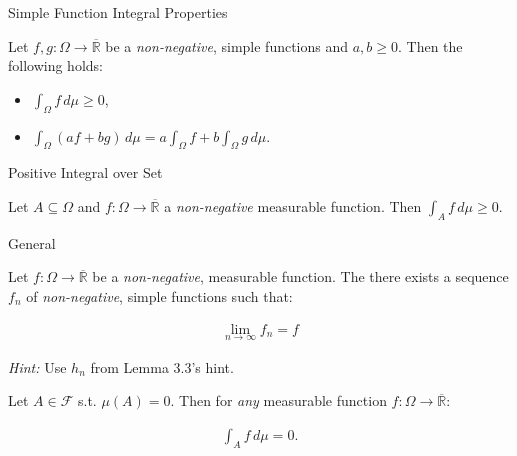 \documentclass[10pt,landscape]{article}
\renewcommand{\geq}{\geqslant}
\newcommand{\Hint}{\textit{Hint: }}
\newcommand{\CalF}{\mathcal{F}}
\begin{document}
\begin{multicols}{3}
\begin{lemma}{3.3}{}
\end{lemma}

\begin{lemma}{}{Simple Function Integral Properties}

    Let $f,g: \Omega \to \overline{\mathbb{R}}$ be a \emph{non-negative}, simple functions and $a,b \geq 0$. Then the following holds:

    \begin{itemize}
        \item $\int_{\Omega} f \, d\mu \geq 0$,
        \item $\int_{\Omega} (af + bg) \, d\mu = a\int_{\Omega} f + b\int_{\Omega}g \, d\mu$.
    \end{itemize}

\end{lemma}

\begin{corollary}{}{Positive Integral over Set}

    Let $A \subseteq \Omega$ and $f: \Omega \to \overline{\mathbb{R}}$ a \emph{non-negative} measurable function. Then $\int_A f \, d\mu \geq 0$.

\end{corollary}

\begin{lemma}{3.3}{General}

    Let $f: \Omega \to \overline{\mathbb{R}}$ be a \emph{non-negative}, measurable function. The there exists a sequence $f_n$ of \emph{non-negative}, simple functions such that:

    \begin{align*}
        \lim_{n \to \infty} f_n = f
    \end{align*}

    \Hint Use $h_n$ from Lemma 3.3's hint.

\end{lemma}

\begin{exercise}{3.5}{}

    Let $A \in \CalF$ s.t. $\mu(A) = 0$. Then for \emph{any} measurable function $f: \Omega \to \overline{\mathbb{R}}$:
    
        \begin{align*}
            \int_A f \,d\mu = 0.
        \end{align*}

\end{exercise}

\begin{exercise}{3.6}{}


\end{exercise}
\end{multicols}
\end{document}
